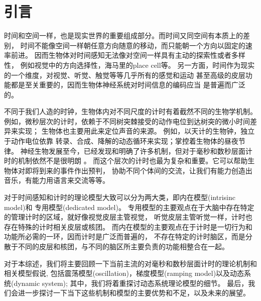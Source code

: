 \section{引言}

时间和空间一样，也是现实世界的重要组成部分。而时间又同空间有本质上的差别，
时间不能像空间一样朝任意方向随意的移动，而只能朝一个方向以固定的速率前进。
因而生物体对时间感知无法像对空间一样具有主动的探索性或者多样性，
例如视觉中的方向选择性，海马里的place cell等。
另一方面，时间作为现实的一个维度，对视觉、听觉、触觉等等几乎所有的感觉和运动
甚至高级的皮层功能都是至关重要的，因而生物体神经系统对时间信息的编码应当
是普遍而广泛的。

不同于我们人造的时钟，生物体内对不同尺度的计时有着截然不同的生物学机制。
例如，微秒层次的计时，依赖于不同树突棘接受的动作电位到达树突的微小时间差异来实现；
生物体也主要用此来定位声音的来源\cite{moiseff1981neuronal}。
例如，以天计的生物钟，独立于动作电位依靠
转录、合成、降解的动态循环来实现；掌控着生物体的昼夜节律\cite{panda2002circadian}。
神经生物发展至今，已经发现和明确了许多机制，但对于毫秒和数秒层面计时的机制依然不是很明朗
\cite{buonomano2007biology,paton2018neural}。
而这个层次的计时也最为复杂和重要。它可以帮助生物体对即将到来的事件作出预判，
协助不同个体间的交流，让我们有能力创造出音乐，有能力用语言来交流等等。

对于时间感知和计时的理论模型大致可以分为两大类，即内在模型(intrisinc model)和
专用模型(dedicated model)\cite{ivry2008dedicated,paton2018neural}。
专用模型的主要观点在于大脑中存在特定的管理计时的区域，就好像视觉皮层主管视觉，
听觉皮层主管听觉一样，计时也存在特殊的计时相关皮层或核团。
而内在模型的主要观点在于计时是一切行为和功能所必需的一环，因而计时是广泛而普遍的，
不存在特定的计时脑区，而是分散于不同的皮层和核团，与不同的脑区所主要负责的功能相整合在一起。


对于本综述，我们将主要回顾一下当前主流的对毫秒和数秒层面计时的理论机制和相关模型假说,
包括震荡模型(oscillation)，梯度模型(ramping model)以及动态系统(dynamic system);
其中，我们将着重探讨动态系统理论模型的细节。
最后，我们会进一步探讨一下当下这些机制和模型的主要优势和不足，以及未来的展望。
